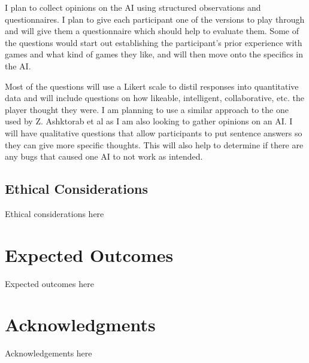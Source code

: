\documentclass{IEEEtran}
\begin{document}
I plan to collect opinions on the AI using structured observations and questionnaires. I plan to give each participant one of the versions to play through and will give them a questionnaire which should help to evaluate them. Some of the questions would start out establishing the participant's prior experience with games and what kind of games they like, and will then move onto the specifics in the AI.

Most of the questions will use a Likert scale to distil responses into quantitative data and will include questions on how likeable, intelligent, collaborative, etc. the player thought they were. I am planning to use a similar approach to the one used by Z. Ashktorab et al \cite{SocialPerceptions2020} as I am also looking to gather opinions on an AI. I will have qualitative questions that allow participants to put sentence answers so they can give more specific thoughts. This will also help to determine if there are any bugs that caused one AI to not work as intended.

\subsection{Ethical Considerations}
\label{EthicalConsiderations}

Ethical considerations here

\section{Expected Outcomes}
\label{ExpectedOutcomes}

Expected outcomes here
 
\section*{Acknowledgments}

Acknowledgements here


 
\end{document}

